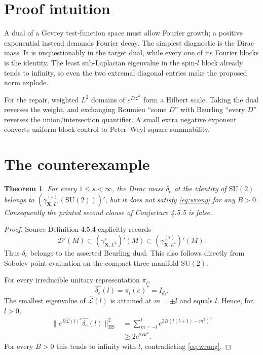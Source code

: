 \documentclass[11pt]{article}
\newtheorem{theorem}{Theorem}
\newcommand{\SU}{\mathrm{SU}(2)}
\newcommand{\cL}{\mathcal L}
\newcommand{\HS}{\mathrm{HS}}
\begin{document}
\section{Proof intuition}

A dual of a Gevrey test-function space must allow Fourier growth; a positive
exponential instead demands Fourier decay.  The simplest diagnostic is the
Dirac mass.  It is unquestionably in the target dual, while every one of its
Fourier blocks is the identity.  The least sub-Laplacian eigenvalue in the
spin-\(l\) block already tends to infinity, so even the two extremal diagonal
entries make the proposed norm explode.

For the repair, weighted \(L^2\) domains of \(e^{D\cL^a}\) form a Hilbert
scale.  Taking the dual reverses the weight, and exchanging Roumieu ``some
\(D\)'' with Beurling ``every \(D\)'' reverses the union/intersection
quantifier.  A small extra negative exponent converts uniform block control
to Peter--Weyl square summability.

\section{The counterexample}

\begin{theorem}\label{thm:counterexample}
For every \(1\le s<\infty\), the Dirac mass \(\delta_e\) at the identity of
\(\SU\) belongs to \((\gamma^{(s)}_{\mathbf X,L^2}(\SU))'\), but it does not
satisfy \eqref{eq:wrong} for any \(B>0\).  Consequently the printed second
clause of Conjecture 4.5.5 is false.
\end{theorem}

\begin{proof}
Source Definition 4.5.4 explicitly records
\[
 \mathcal D'(M)\subset
 (\gamma^s_{\mathbf X,L^2})'(M)\subset
 (\gamma^{(s)}_{\mathbf X,L^2})'(M).
\]
Thus \(\delta_e\) belongs to the asserted Beurling dual.  This also follows
directly from Sobolev point evaluation on the compact three-manifold \(\SU\).

For every irreducible unitary representation \(\pi_l\),
\[
 \widehat{\delta_e}(l)=\pi_l(e)^*=I_{d_l}.
\]
The smallest eigenvalue of \(\widehat{\cL}(l)\) is attained at
\(m=\pm l\) and equals \(l\).  Hence, for \(l>0\),
\begin{align*}
 \|e^{B\widehat{\cL}(l)^a}\widehat{\delta_e}(l)\|_{\HS}^2
 &=\sum_{m=-l}^{l}
       e^{2B(l(l+1)-m^2)^a}\\
 &\ge 2e^{2B l^a}.
\end{align*}
For every \(B>0\) this tends to infinity with \(l\), contradicting
\eqref{eq:wrong}.
\end{proof}
\end{document}
